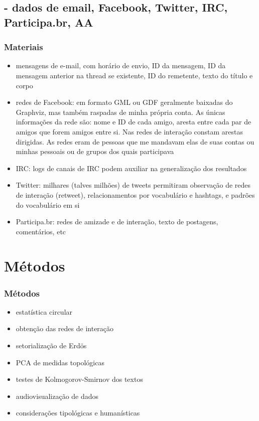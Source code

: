 \documentclass[10pt]{beamer}
\begin{document}
\subsection{- dados de email, Facebook, Twitter, IRC, Participa.br, AA}
\begin{frame}
\frametitle{Materiais}
\begin{itemize}
	\item mensagens de e-mail, com horário de envio, ID da mensagem, ID da mensagem anterior na thread se existente, ID do remetente, texto do título e corpo
	\item redes de Facebook: em formato GML ou GDF geralmente baixadas do Graphviz, mas também raspadas de minha própria conta. As únicas informações da rede são: nome e ID de cada amigo, aresta entre cada par de amigos que forem amigos entre si. Nas redes de interação constam arestas dirigidas. As redes eram de pessoas que me mandavam elas de suas contas ou minhas pessoais ou de grupos dos quais participava
	\item IRC: logs de canais de IRC podem auxiliar na generalização dos resultados
	\item Twitter: milhares (talves milhões) de tweets permitiram observação de redes de interação (retweet), relacionamentos por vocabulário e hashtags, e padrões do vocabulário em si
	\item Participa.br: redes de amizade e de interação, texto de postagens, comentários, etc
\end{itemize}
\end{frame}


\section{Métodos}
\begin{frame}
\frametitle{Métodos}
\begin{itemize}
	\item estatística circular
	\item obtenção das redes de interação
	\item setorialização de Erdös
	\item PCA de medidas topológicas
	\item testes de Kolmogorov-Smirnov dos textos
	\item audiovisualização de dados
	\item considerações tipológicas e humanísticas
\end{itemize}
\end{frame}
\end{document}
